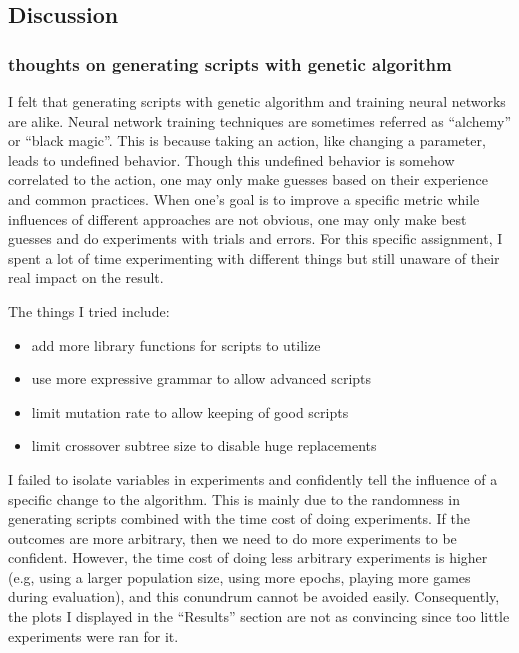 \documentclass[]{article}
\providecommand{\tightlist}{%
  \setlength{\itemsep}{0pt}\setlength{\parskip}{0pt}}
\begin{document}
\subsection{Discussion}\label{discussion}

\subsubsection{thoughts on generating scripts with genetic
algorithm}\label{thoughts-on-generating-scripts-with-genetic-algorithm}

I felt that generating scripts with genetic algorithm and training
neural networks are alike. Neural network training techniques are
sometimes referred as ``alchemy'' or ``black magic''. This is because
taking an action, like changing a parameter, leads to undefined
behavior. Though this undefined behavior is somehow correlated to the
action, one may only make guesses based on their experience and common
practices. When one's goal is to improve a specific metric while
influences of different approaches are not obvious, one may only make
best guesses and do experiments with trials and errors. For this
specific assignment, I spent a lot of time experimenting with different
things but still unaware of their real impact on the result.

The things I tried include:

\begin{itemize}
\tightlist
\item
  add more library functions for scripts to utilize
\item
  use more expressive grammar to allow advanced scripts
\item
  limit mutation rate to allow keeping of good scripts
\item
  limit crossover subtree size to disable huge replacements
\end{itemize}

I failed to isolate variables in experiments and confidently tell the
influence of a specific change to the algorithm. This is mainly due to
the randomness in generating scripts combined with the time cost of
doing experiments. If the outcomes are more arbitrary, then we need to
do more experiments to be confident. However, the time cost of doing
less arbitrary experiments is higher (e.g, using a larger population
size, using more epochs, playing more games during evaluation), and this
conundrum cannot be avoided easily. Consequently, the plots I displayed
in the ``Results'' section are not as convincing since too little
experiments were ran for it.
\end{document}
